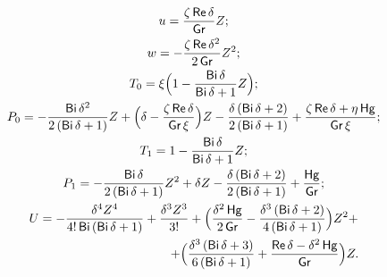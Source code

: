 \begin{gather}

       \label{eq:VVP_EYP:Part_sol_1}

u=\frac{\zeta\mathop{\sf Re }\delta}{\mathop{\sf Gr}} Z;

\\

w= -\frac{\zeta\mathop{\sf Re }\delta^2}{2\mathop{\sf Gr}} Z^2;

\\

T_0=\xi \Bigl(1-\frac{\mathop{\sf Bi}\delta}{\mathop{\sf Bi}\delta+1}Z\Bigr);

\\

P_0=-\frac{\mathop{\sf Bi}\delta^2}{2\left(\mathop{\sf Bi}\delta+1\right)}Z+

\Bigl( \delta-\frac{\zeta\mathop{\sf Re }\delta}{\mathop{\sf Gr} \xi}\Bigr)Z-

\frac{\delta \left(\mathop{\sf Bi}\delta+2\right)}{2\left(\mathop{\sf Bi}\delta+1\right)}+\frac{\zeta\mathop{\sf Re }\delta + \eta \mathop{\sf Hg}}{\mathop{\sf Gr} \xi};

\\

T_1=1-\frac{\mathop{\sf Bi}\delta}{\mathop{\sf Bi}\delta+1}Z;

\\

P_1=-\frac{\mathop{\sf Bi}\delta}{2\left(\mathop{\sf Bi}\delta+1\right)} Z^2+\delta Z -\frac{\delta \left(\mathop{\sf Bi}\delta+2\right)}{2\left(\mathop{\sf Bi}\delta+1\right)}+\frac{\mathop{\sf Hg}}{\mathop{\sf Gr}};

\\ 

U=-\frac{\delta^4 Z^4}{4!\mathop{\sf Bi}\left(\mathop{\sf Bi}\delta+1\right)}+\frac{\delta^3 Z^3}{3!}+

\Bigl(\frac{\delta^2 \mathop{\sf Hg}}{2\mathop{\sf Gr}}- \frac{\delta^3 \left(\mathop{\sf Bi}\delta+2\right)}{4\left(\mathop{\sf Bi}\delta+1\right)}\Bigr)Z^2+

\\

\hspace{4cm}

+\Bigl(\frac{\delta^3\left(\mathop{\sf Bi}\delta+3\right)}{6\left(\mathop{\sf Bi}\delta+1\right)}+\frac{\mathop{\sf Re} \delta - \delta^2 \mathop{\sf Hg}}{\mathop{\sf Gr}} \Bigr)Z.

 \end{gather}

